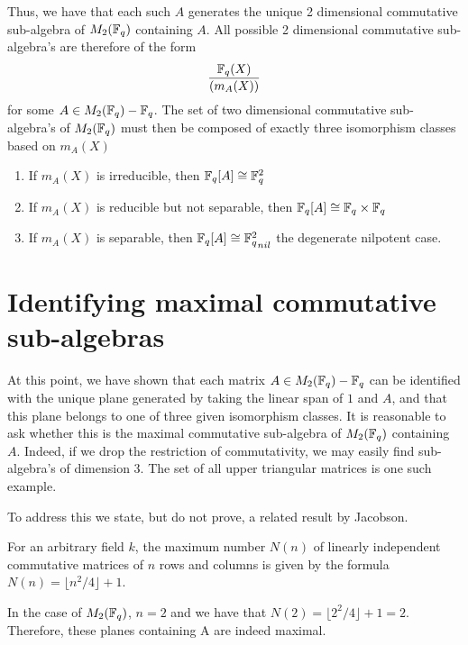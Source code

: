 \documentclass{amsart}
\begin{document}
    Thus, we have that each such $A$ generates the unique 2 dimensional commutative sub-algebra of $M_2(\protect\mathbb{F}_q)$ containing $A$. All possible 2 dimensional commutative sub-algebra's are therefore of the form
    \begin{align*}
        \frac{\protect\mathbb{F}_q(X)}{(m_A(X))}
    \end{align*}
    for some $A \in M_2(\protect\mathbb{F}_q) - \protect\mathbb{F}_q$. The set of two dimensional commutative sub-algebra's of $M_2(\protect\mathbb{F}_q)$ must then be composed of exactly three isomorphism classes based on $m_A(X)$
    \begin{enumerate}
        \item If $m_A(X)$ is irreducible, then $\protect\mathbb{F}_q[A] \cong \protect\mathbb{F}_q^2$
        \item If $m_A(X)$ is reducible but not separable, then $\protect\mathbb{F}_q[A] \cong \protect\mathbb{F}_q \times \protect\mathbb{F}_q$
        \item If $m_A(X)$ is separable, then $\bF_q[A] \cong {\bF_q^2}_{nil}$ the degenerate nilpotent case.
    \end{enumerate}

    

\section{Identifying maximal commutative sub-algebras}

At this point, we have shown that each matrix $A \in M_2(\protect\mathbb{F}_q) - \protect\mathbb{F}_q$ can be identified with the unique plane generated by taking the linear span of $1$ and $A$, and that this plane belongs to one of three given isomorphism classes.
It is reasonable to ask whether this is the maximal commutative sub-algebra of $M_2(\protect\mathbb{F}_q)$ containing $A$. Indeed, if we drop the restriction of commutativity, we may easily find sub-algebra's of dimension 3.
The set of all upper triangular matrices is one such example.

To address this we state, but do not prove, a related result by Jacobson.

\begin{thm}
    For an arbitrary field $k$, the maximum number $N(n)$ of linearly independent commutative matrices of $n$ rows and columns is given by the formula $N(n) = \lfloor n^2/4 \rfloor + 1$.
\end{thm}

In the case of $M_2(\protect\mathbb{F}_q)$, $n=2$ and we have that $N(2) = \lfloor 2^2/4 \rfloor + 1 = 2$. Therefore, these planes containing A are indeed maximal.
\end{document}
